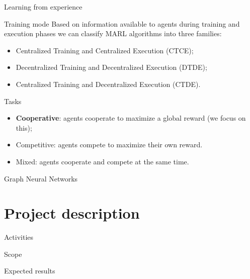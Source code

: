 \documentclass[presentation]{beamer}\mode<presentation>{\usetheme{AMSBolognaFC}}
\begin{document}
\begin{frame}[allowframebreaks]{Learning from experience}
\begin{alertblock}{Training mode}
	Based on information available to agents during training and execution phases we can classify 
		MARL algorithms into three families:
	\begin{itemize}
		\item Centralized Training and Centralized Execution (CTCE);
		\item Decentralized Training and Decentralized Execution (DTDE);
		\item Centralized Training and Decentralized Execution (CTDE).
	\end{itemize}
\end{alertblock}

\begin{alertblock}{Tasks}
	\begin{itemize}
		\item \textbf{Cooperative}: agents cooperate to maximize a global reward (we focus on this);
		\item Competitive: agents compete to maximize their own reward.
		\item Mixed: agents cooperate and compete at the same time.
	\end{itemize}
\end{alertblock}

\end{frame}

\begin{frame}[c]{Graph Neural Networks}
	
\end{frame}



\section{Project description}

\begin{frame}[c]{Activities}

	
\end{frame}

\begin{frame}[c]{Scope}

\end{frame}


\begin{frame}[c]{Expected results}

\end{frame}
\end{document}
